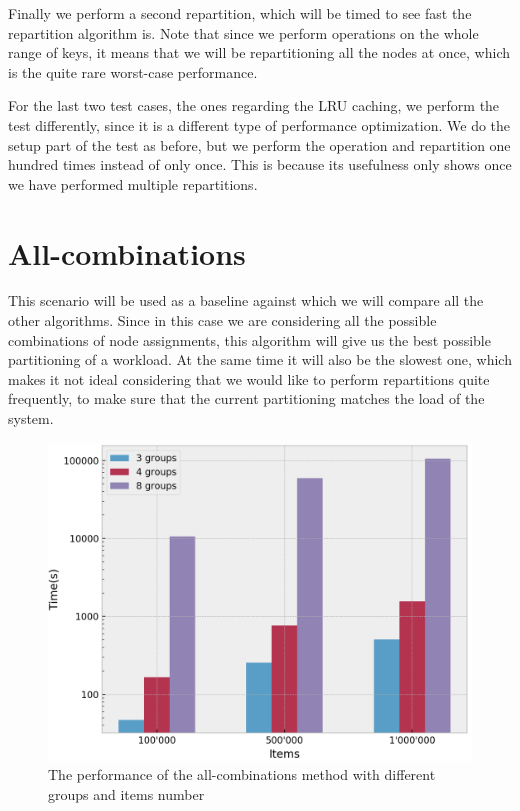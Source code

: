 Finally we perform a second repartition, which will be timed to see fast the repartition algorithm is. Note that since we perform operations on the whole range of keys, it means that we will be repartitioning all the nodes at once, which is the quite rare worst-case performance.

For the last two test cases, the ones regarding the LRU caching, we perform the test differently, since it is a different type of performance optimization. We do the setup part of the test as before, but we perform the operation and repartition one hundred times instead of only once. This is because its usefulness only shows once we have performed multiple repartitions.


\section{All-combinations}\label{sec:All-combinations}
This scenario will be used as a baseline against which we will compare all the other algorithms. Since in this case we are considering all the possible combinations of node assignments, this algorithm will give us the best possible partitioning of a workload. At the same time it will also be the slowest one, which makes it not ideal considering that we would like to perform repartitions quite frequently, to make sure that the current partitioning matches the load of the system.

\begin{figure}[!htb]
  \centering
  \includegraphics[width=\textwidth,height=\textheight,keepaspectratio]{img/all.png}
  \caption{The performance of the all-combinations method with different groups and items number}
  \label{fig:all}
\end{figure}

